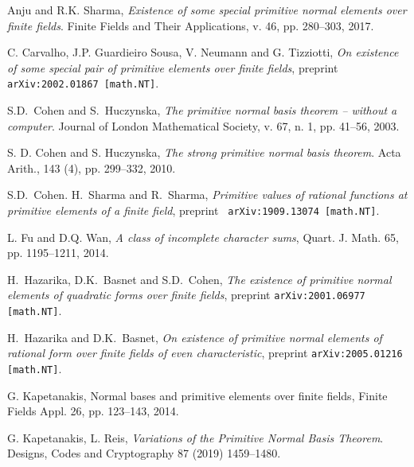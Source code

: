 \documentclass[12pt]{article}
\begin{document}
\begin{thebibliography}{99}

 Anju and R.K. Sharma, {\em Existence of some special 
primitive normal elements over finite fields}. Finite Fields and Their 
Applications, v. 46, pp. 280--303, 2017.


 C. Carvalho, J.P. Guardieiro Sousa, V. Neumann and G. 
Tizziotti, {\em On existence of some special pair of primitive elements over 
finite fields}, preprint {\tt arXiv:2002.01867 [math.NT]}.


 S.D.\ Cohen and S.\ Huczynska, {\em The primitive normal basis 
theorem -- without a computer}. Journal of London Mathematical Society, v. 67, 
n. 1, pp. 41--56, 2003.

 S. D. Cohen and S. Huczynska, {\em The strong primitive normal basis theorem}. Acta Arith., 143 (4), pp. 299--332, 2010.

S.D.\ Cohen. H.\ Sharma and R.\ Sharma, {\em Primitive values of rational 
functions at primitive elements of a finite field},  preprint {\tt 
arXiv:1909.13074 [math.NT]}.

 L. Fu and D.Q. Wan, {\em A class of incomplete character sums}, 
Quart. J. Math. 65, pp. 1195--1211, 2014.


 H.\ Hazarika, D.K.\ Basnet and S.D.\ Cohen, {\em The existence of 
primitive normal elements of quadratic forms over finite fields}, 
preprint {\tt arXiv:2001.06977 [math.NT]}.


 H.\ Hazarika and  D.K.\ Basnet, {\em On existence of primitive 
normal elements of rational form over finite fields of even characteristic},
preprint {\tt arXiv:2005.01216 [math.NT]}.


 G. Kapetanakis, Normal bases and primitive elements over 
finite fields, Finite Fields Appl. 26, 
pp. 123--143, 2014.

 G. Kapetanakis, L. Reis, {\em Variations of the Primitive
	Normal Basis Theorem}.
Designs, Codes and Cryptography 87 (2019) 1459--1480.


\end{thebibliography}
\end{document}
